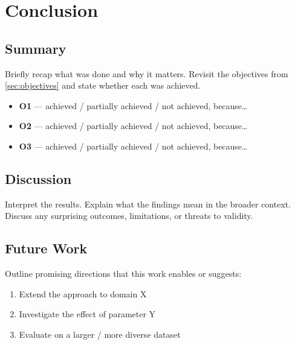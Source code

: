 \section{Conclusion}
\label{sec:conclusion}

\subsection{Summary}

Briefly recap what was done and why it matters. Revisit the objectives from
\cref{sec:objectives} and state whether each was achieved.

\begin{itemize}
  \item \textbf{O1} — achieved / partially achieved / not achieved, because\ldots
  \item \textbf{O2} — achieved / partially achieved / not achieved, because\ldots
  \item \textbf{O3} — achieved / partially achieved / not achieved, because\ldots
\end{itemize}

\subsection{Discussion}

Interpret the results. Explain what the findings mean in the broader context.
Discuss any surprising outcomes, limitations, or threats to validity.

\subsection{Future Work}

Outline promising directions that this work enables or suggests:

\begin{enumerate}
  \item Extend the approach to domain X
  \item Investigate the effect of parameter Y
  \item Evaluate on a larger / more diverse dataset
\end{enumerate}
